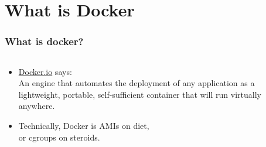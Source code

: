\documentclass[mathserif,serif]{beamer}
\begin{document}
    \section{What is Docker}\label{sec:whatIsDocker}
    \begin{frame}
        \frametitle{What is docker?}
        \begin{columns}[t]
            \begin{column}{0.40\textwidth}
                \begin{itemize}[<+->]
                    \item \href{https://www.docker.com/what-docker}{Docker.io} says: \\
                          An engine that automates the deployment of any application as a lightweight,
                          portable, self-sufficient container that will run virtually anywhere.

                    \item Technically, Docker is AMIs on diet, \\
                          or cgroups on steroids.
                \end{itemize}
            \end{column}
            \begin{column}{0.40\textwidth}
                \begin{center}
                \end{center}
            \end{column}
        \end{columns}
    \end{frame}
\end{document}
